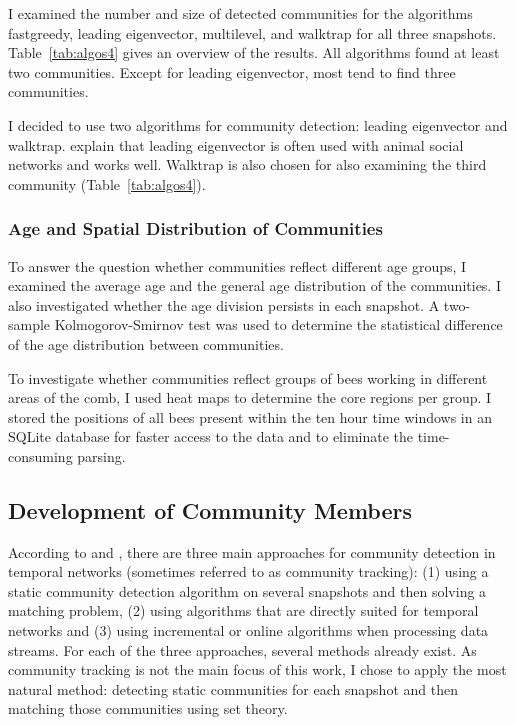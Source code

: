 I examined the number and size of detected communities for the algorithms fastgreedy, leading eigenvector, multilevel, and walktrap for all three snapshots. Table~\ref{tab:algos4} gives an overview of the results.
All algorithms found at least two communities.
Except for leading eigenvector, most tend to find three communities.

I decided to use two algorithms for community detection: leading eigenvector and walktrap. \textcite{farine2015constructing} explain that leading eigenvector is often used with animal social networks and works well. Walktrap is also chosen for also examining the third community (Table~\ref{tab:algos4}).




\subsubsection{Age and Spatial Distribution of Communities}
To answer the question whether communities reflect different age groups, I examined the average age and the general age distribution of the communities.
I also investigated whether the age division persists in each snapshot.
A two-sample Kolmogorov-Smirnov test was used to determine the statistical difference of the age distribution between communities.

To investigate whether communities reflect groups of bees working in different areas of the comb, I used heat maps to determine the core regions per group.
I stored the positions of all bees present within the ten hour time windows in an SQLite database for faster access to the data and to eliminate the time-consuming parsing.

\subsection{Development of Community Members}
\label{sec:bg:tracking}
According to \textcite{aynaud2013communities} and  \textcite{brodka2014community}, there are three main approaches for community detection in temporal networks (sometimes referred to as community tracking): (1) using a static community detection algorithm on several snapshots and then solving a matching problem, (2) using algorithms that are directly suited for temporal networks and (3) using incremental or online algorithms when processing data streams.
For each of the three approaches, several methods already exist.
As community tracking is not the main focus of this work, I chose to apply the most natural method: detecting static communities for each snapshot and then matching those communities using set theory.

